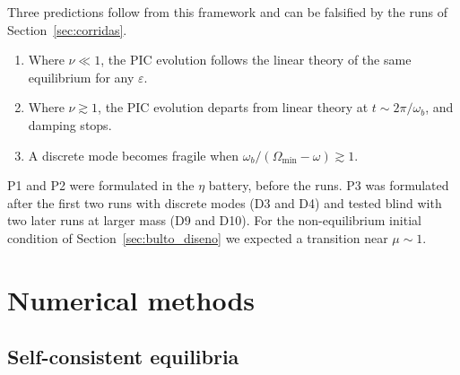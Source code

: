 \documentclass[11pt,a4paper]{article}
\begin{document}
Three predictions follow from this framework and can be falsified by the runs of
Section~\ref{sec:corridas}.
\begin{enumerate}
\item[P1.] Where $\nu\ll1$, the PIC evolution follows the linear theory of the same
equilibrium for any $\varepsilon$.
\item[P2.] Where $\nu\gtrsim1$, the PIC evolution departs from linear theory at
$t\sim2\pi/\omega_b$, and damping stops.
\item[P3.] A discrete mode becomes fragile when $\omega_b/(\Omega_{\min}-\omega)\gtrsim1$.
\end{enumerate}
P1 and P2 were formulated in the $\eta$ battery, before the runs. P3 was formulated after
the first two runs with discrete modes (D3 and D4) and tested blind with two later runs
at larger mass (D9 and D10). For the non-equilibrium initial condition of
Section~\ref{sec:bulto_diseno} we expected a transition near $\mu\sim1$.

\section{Numerical methods}
\label{sec:metodos}

\subsection{Self-consistent equilibria}
\label{sec:construccion}
\end{document}
